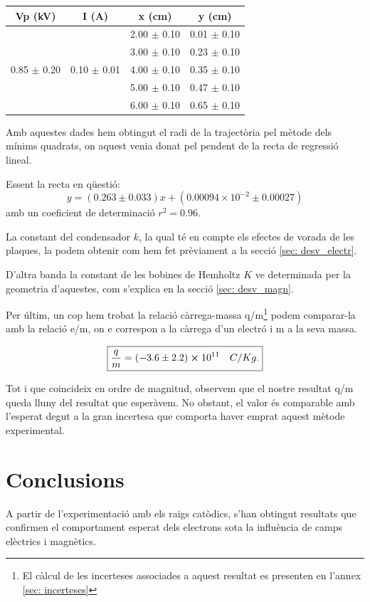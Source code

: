 \documentclass[11pt]{article}
\begin{document}
\begin{table}[h!]
\centering
\begin{tabular}{|c|c|c|c|}
\hline
\textbf{Vp (kV)} & \textbf{I (A)} & \textbf{x (cm)} & \textbf{y (cm)} \\
\hline
 &  & 2.00 $\pm$ 0.10 & 0.01 $\pm$ 0.10 \\
 &  & 3.00 $\pm$ 0.10 & 0.23 $\pm$ 0.10 \\
0.85 $\pm$ 0.20 & 0.10 $\pm$ 0.01 & 4.00 $\pm$ 0.10 & 0.35 $\pm$ 0.10 \\
 &  & 5.00 $\pm$ 0.10 & 0.47 $\pm$ 0.10 \\
 &  & 6.00 $\pm$ 0.10 & 0.65 $\pm$ 0.10 \\
\hline
\end{tabular}
\end{table}

Amb aquestes dades hem obtingut el radi de la trajectòria pel mètode dels mínims quadrats, on aquest venia donat pel pendent de la recta de regressió lineal.

Essent la recta en qüestió: 
\begin{equation}
    y=(0.263 \pm 0.033)x + (0.00094\times10^{-2} \pm 0.00027)
\end{equation}  
amb un coeficient de determinació $r^2=0.96$.

La constant del condensador $k$, la qual té en compte els efectes de vorada de les plaques, la podem obtenir com hem fet prèviament a la secció \ref{sec: desv_electr}. 

D'altra banda la constant de les bobines de Hemholtz $K$ ve determinada per la geometria d'aquestes, com s'explica en la secció \ref{sec: desv_magn}.

Per últim, un cop hem trobat la relació càrrega-massa q/m\footnote{El càlcul de les incerteses associades a aquest resultat es presenten en l'annex \ref{sec: incerteses}} podem comparar-la amb la relació e/m, on e correspon a la càrrega d'un electró i m a la seva massa.

\[
\boxed{\frac{q}{m}=(-3.6\pm2.2)\cross10^{11}\quad C/Kg.}
\] 

Tot i que coincideix en ordre de magnitud, observem que el nostre resultat q/m queda lluny del resultat que esperàvem. No obstant, el valor és comparable amb l'esperat degut a la gran incertesa que comporta haver emprat aquest mètode experimental. 

\section{Conclusions}
A partir de l'experimentació amb els raigs catòdics, s'han obtingut resultats que confirmen el comportament esperat dels electrons sota la influència de camps elèctrics i magnètics. 
    
\end{document}
